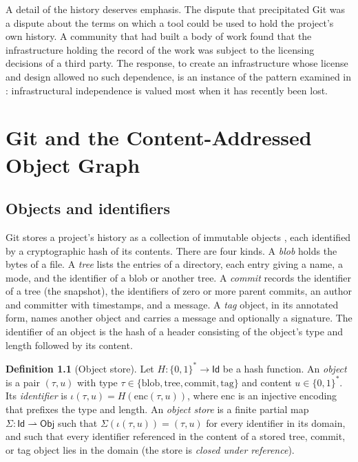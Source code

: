 \documentclass[11pt,twoside,openright]{book}
\theoremstyle{plain}
\theoremstyle{definition}
\newtheorem{definition}[theorem]{Definition}
\theoremstyle{remark}
\begin{document}
A detail of the history deserves emphasis. The dispute that precipitated Git was a dispute about the terms on which a tool could be used to hold the project's own history. A community that had built a body of work found that the infrastructure holding the record of the work was subject to the licensing decisions of a third party. The response, to create an infrastructure whose license and design allowed no such dependence, is an instance of the pattern examined in : infrastructural independence is valued most when it has recently been lost.

\chapter{Git and the Content-Addressed Object Graph}\label{ch:git}

\section{Objects and identifiers}

Git stores a project's history as a collection of immutable objects \cite{chacon2014}, each identified by a cryptographic hash of its contents. There are four kinds. A \emph{blob} holds the bytes of a file. A \emph{tree} lists the entries of a directory, each entry giving a name, a mode, and the identifier of a blob or another tree. A \emph{commit} records the identifier of a tree (the snapshot), the identifiers of zero or more parent commits, an author and committer with timestamps, and a message. A \emph{tag} object, in its annotated form, names another object and carries a message and optionally a signature. The identifier of an object is the hash of a header consisting of the object's type and length followed by its content.

\begin{definition}[Object store]\label{def:objstore}
Let $H:\{0,1\}^*\to\mathsf{Id}$ be a hash function. An \emph{object} is a pair $(\tau,u)$ with type $\tau\in\{\mathrm{blob},\mathrm{tree},\mathrm{commit},\mathrm{tag}\}$ and content $u\in\{0,1\}^*$. Its \emph{identifier} is $\iota(\tau,u)=H(\mathrm{enc}(\tau,u))$, where $\mathrm{enc}$ is an injective encoding that prefixes the type and length. An \emph{object store} is a finite partial map $\Sigma:\mathsf{Id}\rightharpoonup\mathsf{Obj}$ such that $\Sigma(\iota(\tau,u))=(\tau,u)$ for every identifier in its domain, and such that every identifier referenced in the content of a stored tree, commit, or tag object lies in the domain (the store is \emph{closed under reference}).
\end{definition}
\end{document}
